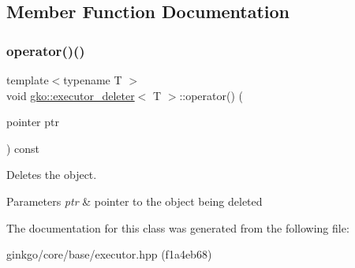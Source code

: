 \subsection{Member Function Documentation}
\mbox{\label{classgko_1_1executor__deleter_aaefa9d9f1c8ae4f4723668d5f946e5c0}} 
\subsubsection{\texorpdfstring{operator()()}{operator()()}}
{\footnotesize\ttfamily template$<$typename T $>$ \\
void \hyperlink{classgko_1_1executor__deleter}{gko\+::executor\+\_\+deleter}$<$ T $>$\+::operator() (\begin{DoxyParamCaption}\item[{pointer}]{ptr }\end{DoxyParamCaption}) const\hspace{0.3cm}{\ttfamily [inline]}}



Deletes the object. 


\begin{DoxyParams}{Parameters}
{\em ptr} & pointer to the object being deleted \\
\hline
\end{DoxyParams}


The documentation for this class was generated from the following file\+:\begin{DoxyCompactItemize}
\item 
ginkgo/core/base/executor.\+hpp (f1a4eb68)\end{DoxyCompactItemize}
